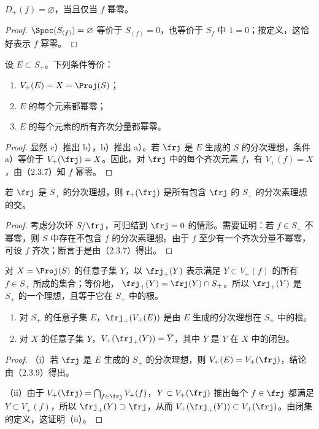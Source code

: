 $D_+(f)=\varnothing$，当且仅当 $f$ 幂零。
\begin{proof}
$\Spec(S_{(f)})=\varnothing$ 等价于 $S_{(f)}=0$，也等价于 $S_f$ 中 $1=0$；按定义，这恰好表示 $f$ 幂零。
\end{proof}

设 $E\subset S_+$。下列条件等价：
\begin{enumerate}[label=\alph*)]
\item $V_+(E)=X=\Proj(S)$；
\item $E$ 的每个元素都幂零；
\item $E$ 的每个元素的所有齐次分量都幂零。
\end{enumerate}
\begin{proof}
显然 c）推出 b），b）推出 a）。若 $\frj$ 是 $E$ 生成的 $S$ 的分次理想，条件 a）等价于 $V_+(\frj)=X$。因此，对 $\frj$ 中的每个齐次元素 $f$，有 $V_+(f)=X$，由（2.3.7）知 $f$ 幂零。
\end{proof}

若 $\frj$ 是 $S_+$ 的分次理想，则 $\mathfrak r_+(\frj)$ 是所有包含 $\frj$ 的 $S_+$ 的分次素理想的交。
\begin{proof}
考虑分次环 $S/\frj$，可归结到 $\frj=0$ 的情形。需要证明：若 $f\in S_+$ 不幂零，则 $S$ 中存在不包含 $f$ 的分次素理想。由于 $f$ 至少有一个齐次分量不幂零，可设 $f$ 齐次；断言于是由（2.3.7）得出。
\end{proof}

对 $X=\Proj(S)$ 的任意子集 $Y$，以 $\frj_+(Y)$ 表示满足 $Y\subset V_+(f)$ 的所有 $f\in S_+$ 所成的集合；等价地，
$\frj_+(Y)=\frj(Y)\cap S_+$。所以 $\frj_+(Y)$ 是 $S_+$ 的一个理想，且等于它在 $S_+$ 中的根。

\begin{enumerate}[label=(\roman*)]
\item 对 $S_+$ 的任意子集 $E$，$\frj_+(V_+(E))$ 是由 $E$ 生成的分次理想在 $S_+$ 中的根。
\item 对 $X$ 的任意子集 $Y$，$V_+(\frj_+(Y))=\overline Y$，其中 $\overline Y$ 是 $Y$ 在 $X$ 中的闭包。
\end{enumerate}
\begin{proof}
（i）若 $\frj$ 是 $E$ 生成的 $S_+$ 的分次理想，则 $V_+(E)=V_+(\frj)$，结论由（2.3.9）得出。

（ii）由于 $V_+(\frj)=\bigcap_{f\in\frj}V_+(f)$，$Y\subset V_+(\frj)$ 推出每个 $f\in\frj$ 都满足 $Y\subset V_+(f)$，所以 $\frj_+(Y)\supset\frj$，从而
$V_+(\frj_+(Y))\subset V_+(\frj)$。由闭集的定义，这证明（ii）。
\end{proof}

